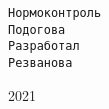 \documentclass[12pt,cmcyralt]{article}
\begin{document}
\begin{titlepage}
    \begin{alltt}                                                         
                      Нормоконтроль                                             
                      Подогова                                            
                      Разработал                                                        
                      Резванова                                         
    \end{alltt}                                                           
                                                                                        
                                                                                        
    \vspace{\fill}                                                    
                                                                                        
    \begin{center}                                                        
     2021                                                                
    \end{center}                                                          
                                                                                        
    \end{titlepage}
\end{document}
